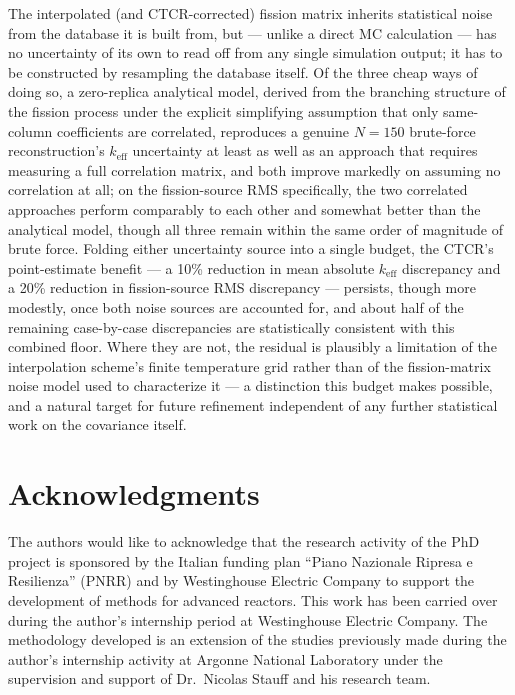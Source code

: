 \documentclass{style/nseJournal}
\begin{document}
The interpolated (and CTCR-corrected) fission matrix inherits statistical noise from the database it is built from, but --- unlike a direct MC calculation --- has no uncertainty of its own to read off from any single simulation output; it has to be constructed by resampling the database itself. Of the three cheap ways of doing so, a zero-replica analytical model, derived from the branching structure of the fission process under the explicit simplifying assumption that only same-column coefficients are correlated, reproduces a genuine $N=150$ brute-force reconstruction's $k_{\text{eff}}$ uncertainty at least as well as an approach that requires measuring a full correlation matrix, and both improve markedly on assuming no correlation at all; on the fission-source RMS specifically, the two correlated approaches perform comparably to each other and somewhat better than the analytical model, though all three remain within the same order of magnitude of brute force. Folding either uncertainty source into a single budget, the CTCR's point-estimate benefit --- a 10\% reduction in mean absolute $k_{\text{eff}}$ discrepancy and a 20\% reduction in fission-source RMS discrepancy --- persists, though more modestly, once both noise sources are accounted for, and about half of the remaining case-by-case discrepancies are statistically consistent with this combined floor. Where they are not, the residual is plausibly a limitation of the interpolation scheme's finite temperature grid rather than of the fission-matrix noise model used to characterize it --- a distinction this budget makes possible, and a natural target for future refinement independent of any further statistical work on the covariance itself.

\section*{Acknowledgments}

The authors would like to acknowledge that the research activity of the PhD project is sponsored by the Italian funding plan ``Piano Nazionale Ripresa e Resilienza'' (PNRR) and by Westinghouse Electric Company to support the development of methods for advanced reactors. This work has been carried over during the author's internship period at Westinghouse Electric Company. The methodology developed is an extension of the studies previously made during the author's internship activity at Argonne National Laboratory under the supervision and support of Dr.\ Nicolas Stauff and his research team.

\pagebreak


\end{document}
